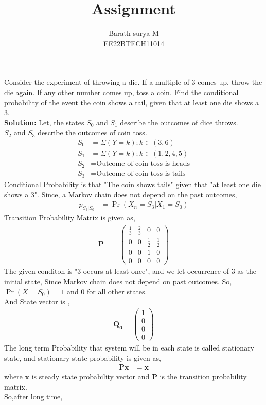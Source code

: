 \documentclass[journal,12pt,two column]{IEEEtran}
\title{Assignment}
\author{Barath surya M \\ EE22BTECH11014}
\providecommand{\pr}[1]{\ensuremath{\Pr\left(#1\right)}}
\providecommand{\brak}[1]{\ensuremath{\left(#1\right)}}
\newcommand{\solution}{\noindent \textbf{Solution: }}
\newcommand{\myvec}[1]{\ensuremath{\begin{pmatrix}#1\end{pmatrix}}}
\providecommand{\pr}[1]{\ensuremath{\Pr\left(#1\right)}}
\let\vec\mathbf
\begin{document}
\maketitle
Consider the experiment of throwing a die. If a multiple of 3 comes up, throw the die again. If any other number comes up, toss a coin. Find the conditional probability of the event the coin shows a tail, given that  at least one die shows a 3.\\
\solution
Let, the states $S_0$ and $S_1$ describe the outcomes of dice throws.\\
$S_2$ and $S_3$ describe the outcomes of coin toss.
\begin{align}
    S_0 &= \Sigma{\brak{Y=k}} ;k\in{\brak{3,6}}\\
    S_1 &= \Sigma{\brak{Y=k}} ; k\in{\brak{1,2,4,5}}\\
    S_2 &= \text{Outcome of coin toss is heads}\\
    S_3 &= \text{Outcome of coin toss is tails}
\end{align}
Conditional Probability is that "The coin shows tails" given that "at least one die shows a 3".
Since, a Markov chain does not depend on the past outcomes,
\begin{align}
    p_{S_3 | S_0}&=\pr{X_n=S_3|X_1 =S_0}
\end{align}
Transition Probability Matrix is given as,
\begin{align}
    \vec{P}&=\myvec{\frac{1}{3}&\frac{2}{3}&0&0\\
                0&0&\frac{1}{2}&\frac{1}{2}\\
                0&0&1&0\\
                0&0&0&0
                }
\end{align}
The given conditon is "3 occurs at least once", and we let occurrence of 3 as the initial state, Since Markov chain does not depend on past outcomes. So, $\pr{X=S_0}=1$ and 0 for all other states.\\
And State vector is ,
\begin{align}
    \vec{Q_0}=\myvec{1\\0\\0\\0}
\end{align}
The long term Probability that system will be in each state is called stationary state, and stationary state probability is given as,
\begin{align}
    \vec{Px}&=\vec{x}
\end{align}
where $\vec{x}$ is steady state probability vector and $\vec{P}$ is the transition probability matrix.\\So,after long time,
\end{document}
